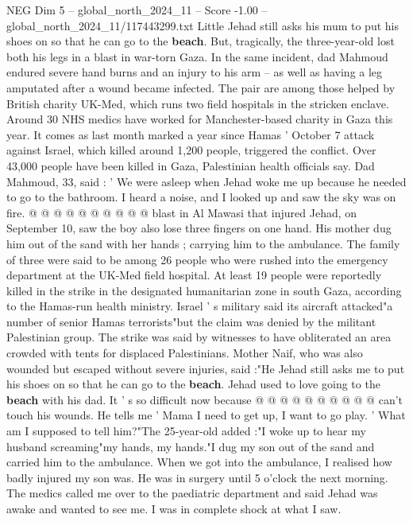 \begin{textsample}{NEG Dim 5 – global\_north\_2024\_11 – Score -1.00 – global\_north\_2024\_11/117443299.txt}  \label{ex:f5_neg_420}
Little Jehad still asks his mum to put his shoes on so that he can go to the \textbf{beach}.
But, tragically, the three-year-old lost both his legs in a blast in war-torn Gaza.
In the same incident, dad Mahmoud endured severe hand burns and an injury to his arm -- as well as having a leg amputated after a wound became infected.
The pair are among those helped by British charity UK-Med, which runs two field hospitals in the stricken enclave.
Around 30 NHS medics have worked for Manchester-based charity in Gaza this year.
It comes as last month marked a year since Hamas ' October 7 attack against Israel, which killed around 1,200 people, triggered the conflict.
Over 43,000 people have been killed in Gaza, Palestinian health officials say.
Dad Mahmoud, 33, said : ' We were asleep when Jehad woke me up because he needed to go to the bathroom.
I heard a noise, and I looked up and saw the sky was on fire. @ @ @ @ @ @ @ @ @ @ blast in Al Mawasi that injured Jehad, on September 10, saw the boy also lose three fingers on one hand.
His mother dug him out of the sand with her hands ; carrying him to the ambulance.
The family of three were said to be among 26 people who were rushed into the emergency department at the UK-Med field hospital.
At least 19 people were reportedly killed in the strike in the designated humanitarian zone in south Gaza, according to the Hamas-run health ministry.
Israel ' s military said its aircraft attacked"a number of senior Hamas terrorists"but the claim was denied by the militant Palestinian group.
The strike was said by witnesses to have obliterated an area crowded with tents for displaced Palestinians.
Mother Naif, who was also wounded but escaped without severe injuries, said :"He Jehad still asks me to put his shoes on so that he can go to the \textbf{beach}.
Jehad used to love going to the \textbf{beach} with his dad.
It ' s so difficult now because @ @ @ @ @ @ @ @ @ @ can't touch his wounds.
He tells me ' Mama I need to get up, I want to go play. ' What am I supposed to tell him?"The 25-year-old added :"I woke up to hear my husband screaming"my hands, my hands."I dug my son out of the sand and carried him to the ambulance.
When we got into the ambulance, I realised how badly injured my son was.
He was in surgery until 5 o'clock the next morning.
The medics called me over to the paediatric department and said Jehad was awake and wanted to see me.
I was in complete shock at what I saw.

\end{textsample}
